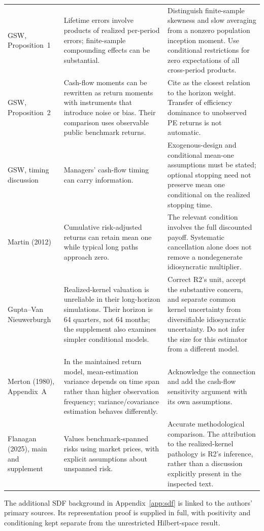 \documentclass[11pt]{article}
\theoremstyle{plain}
\theoremstyle{definition}
\begin{document}
{\begin{longtable}{@{}L{2.3cm}L{6.3cm}L{6.7cm}@{}}
GSW, Proposition~1 & Lifetime errors involve products of realized per-period errors; finite-sample compounding effects can be substantial. & Distinguish finite-sample skewness and slow averaging from a nonzero population inception moment. Use conditional restrictions for zero expectations of all cross-period products.\\
GSW, Proposition~2 & Cash-flow moments can be rewritten as return moments with instruments that introduce noise or bias. Their comparison uses observable public benchmark returns. & Cite as the closest relation to the horizon weight. Transfer of efficiency dominance to unobserved PE returns is not automatic.\\
GSW, timing discussion & Managers' cash-flow timing can carry information. & Exogenous-design and conditional mean-one assumptions must be stated; optional stopping need not preserve mean one conditional on the realized stopping time.\\
Martin (2012) & Cumulative risk-adjusted returns can retain mean one while typical long paths approach zero. & The relevant condition involves the full discounted payoff. Systematic cancellation alone does not remove a nondegenerate idiosyncratic multiplier.\\
Gupta--Van Nieuwerburgh & Realized-kernel valuation is unreliable in their long-horizon simulations. Their horizon is 64 quarters, not 64 months; the supplement also examines simpler conditional models. & Correct R2's unit, accept the substantive concern, and separate common kernel uncertainty from diversifiable idiosyncratic uncertainty. Do not infer the size for this estimator from a different model.\\
Merton (1980), Appendix~A & In the maintained return model, mean-estimation variance depends on time span rather than higher observation frequency; variance/covariance estimation behaves differently. & Acknowledge the connection and add the cash-flow sensitivity argument with its own assumptions.\\
Flanagan (2025), main and supplement & Values benchmark-spanned risks using market prices, with explicit assumptions about unspanned risk. & Accurate methodological comparison. The attribution to the realized-kernel pathology is R2's inference, rather than a discussion explicitly present in the inspected text.\\
\bottomrule
\end{longtable}
}

The additional SDF background in Appendix~\ref{app:sdf} is linked to the authors' primary sources. Its representation proof is supplied in full, with positivity and conditioning kept separate from the unrestricted Hilbert-space result.
\end{document}
